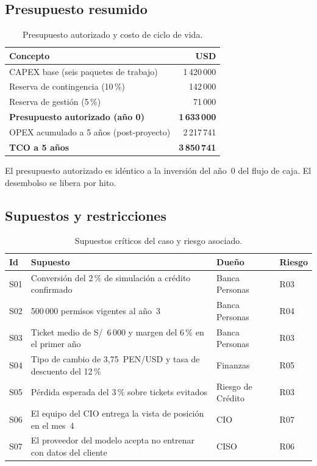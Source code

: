 \documentclass[11pt,a4paper]{article}
\newcommand{\pen}[1]{S/~#1}
\begin{document}
\subsection{Presupuesto resumido}

\begin{table}[H]
\centering
\caption{Presupuesto autorizado y costo de ciclo de vida.}
\small
\begin{tabularx}{0.85\textwidth}{@{}X r@{}}
\toprule
\textbf{Concepto} & \textbf{USD} \\
\midrule
CAPEX base (seis paquetes de trabajo) & 1\,420\,000 \\
Reserva de contingencia (10\,\%) & 142\,000 \\
Reserva de gestión (5\,\%) & 71\,000 \\
\midrule
\textbf{Presupuesto autorizado (año 0)} & \textbf{1\,633\,000} \\
OPEX acumulado a 5 años (post-proyecto) & 2\,217\,741 \\
\textbf{TCO a 5 años} & \textbf{3\,850\,741} \\
\bottomrule
\end{tabularx}
\end{table}

El presupuesto autorizado es idéntico a la inversión del año~0 del flujo de caja. El desembolso se libera por hito.

\subsection{Supuestos y restricciones}

\begin{table}[H]
\centering
\caption{Supuestos críticos del caso y riesgo asociado.}
\small
\begin{tabularx}{\textwidth}{@{}l X p{2.9cm} l@{}}
\toprule
\textbf{Id} & \textbf{Supuesto} & \textbf{Dueño} & \textbf{Riesgo} \\
\midrule
S01 & Conversión del 2\,\% de simulación a crédito confirmado & Banca Personas & R03 \\
S02 & 500\,000 permisos vigentes al año~3 & Banca Personas & R04 \\
S03 & Ticket medio de \pen{6\,000} y margen del 6\,\% en el primer año & Banca Personas & R03 \\
S04 & Tipo de cambio de 3,75~PEN/USD y tasa de descuento del 12\,\% & Finanzas & R05 \\
S05 & Pérdida esperada del 3\,\% sobre tickets evitados & Riesgo de Crédito & R03 \\
S06 & El equipo del CIO entrega la vista de posición en el mes~4 & CIO & R07 \\
S07 & El proveedor del modelo acepta no entrenar con datos del cliente & CISO & R06 \\
\bottomrule
\end{tabularx}
\end{table}
\end{document}
